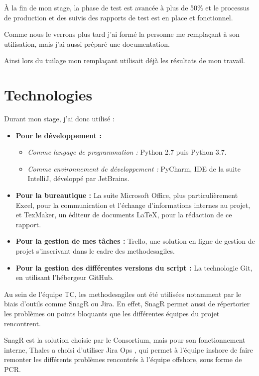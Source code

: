 À la fin de mon stage, la phase de test est avancée à plus de 50\% et le processus de production et des suivis des rapports de test est en place et fonctionnel.

Comme nous le verrons plus tard j'ai formé la personne me remplaçant à son utilisation, mais j'ai aussi préparé une documentation.

Ainsi lors du tuilage mon remplaçant utilisait déjà les résultats de mon travail.


\newpage
\section{Technologies}
Durant mon stage, j'ai donc utilisé :
\begin{itemize}
\item \textbf{Pour le développement :}
\begin{itemize}
\item \textit{Comme langage de programmation :} Python 2.7 puis Python 3.7.
\item \textit{Comme environnement de développement :} PyCharm, \gls{IDE} de la suite IntelliJ, développé par JetBrains.
\end{itemize}
\item \textbf{Pour la bureautique :} La suite Microsoft Office, plus particulièrement Excel, pour la communication et l'échange d'informations internes au projet, et TexMaker, un éditeur de documents \gls{LaTeX}, pour la rédaction de ce rapport.
\item \textbf{Pour la gestion de mes tâches :} Trello, une solution en ligne de gestion de projet s'inscrivant dans le cadre des \gls{methodesagiles}.
\item \textbf{Pour la gestion des différentes versions du script :} La technologie \gls{Git}, en utilisant l'hébergeur GitHub.
\end{itemize}

Au sein de l'équipe \gls{TC}, les \gls{methodesagiles} ont été utilisées notamment par le biais d'outils comme \gls{SnagR} ou Jira. En effet, \gls{SnagR} permet aussi de répertorier les problèmes ou points bloquants que les différentes équipes du projet rencontrent.

\gls{SnagR} est la solution choisie par le Consortium, mais pour son fonctionnement interne, Thales a choisi d'utiliser Jira Ops , qui permet à l'équipe inshore de faire remonter les différents problèmes rencontrés à l'équipe offshore, sous forme de \gls{PCR}.

